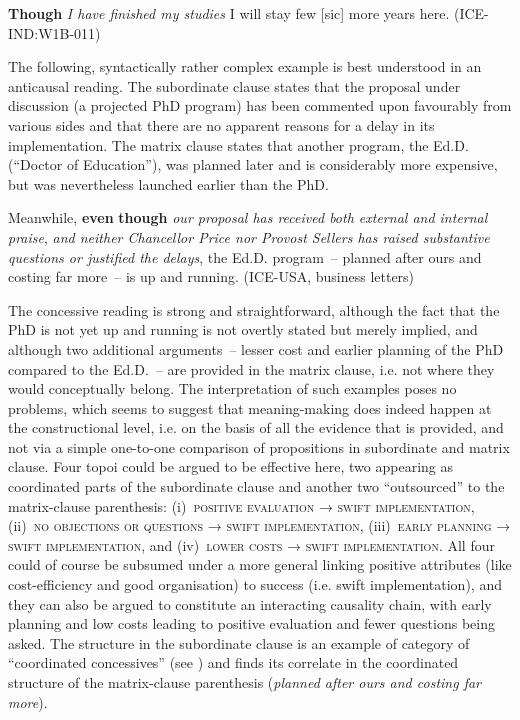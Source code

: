\ea\label{ex:43}   \label{bkm:Ref487277508}\textbf{Though} \textit{I have finished my studies} I will stay few [sic] more years here. (ICE-IND:W1B-011)
\z

The following, syntactically rather complex example is best understood in an anticausal reading. The subordinate clause states that the proposal under discussion (a projected PhD program) has been commented upon favourably from various sides and that there are no apparent reasons for a delay in its implementation. The matrix clause states that another program, the Ed.D. (“Doctor of Education”), was planned later and is considerably more expensive, but was nevertheless launched earlier than the PhD.

\eanoraggedright\label{ex:44} \label{bkm:Ref497554696}  Meanwhile, \textbf{even} \textbf{though} \textit{our proposal has received both external and internal praise}, \textit{and neither Chancellor Price nor Provost Sellers has raised substantive questions or justified the delays}, the Ed.D. program~– planned after ours and costing far more~– is up and running. (ICE-USA, business letters)
\z

The concessive reading is strong and straightforward, although the fact that the PhD is not yet up and running is not overtly stated but merely implied, and although two additional arguments~– lesser cost and earlier planning of the PhD compared to the Ed.D.~– are provided in the matrix clause, i.e. not where they would conceptually belong. The interpretation of such examples poses no problems, which seems to suggest that meaning-making does indeed happen at the constructional level, i.e. on the basis of all the evidence that is provided, and not via a simple one-to-one comparison of propositions in subordinate and matrix clause. Four topoi could be argued to be effective here, two appearing as coordinated parts of the subordinate clause and another two “outsourced” to the matrix-clause parenthesis:
(i)~\textsc{positive} \textsc{evaluation} → \textsc{swift} \textsc{implementation},
(ii)~\textsc{no} \textsc{objections} \textsc{or} \textsc{questions} → \textsc{swift} \textsc{implementation},
(iii)~\textsc{early} \textsc{planning} → \textsc{swift} \textsc{implementation}, and
(iv)~\textsc{lower} \textsc{costs} → \textsc{swift} \textsc{implementation}. All four could of course be subsumed under a more general  linking positive attributes (like cost-efficiency and good organisation) to success (i.e. swift implementation), and they can also be argued to constitute an interacting causality chain, with early planning and low costs leading to positive evaluation and fewer questions being asked. The structure in the subordinate clause is an example of  category of “coordinated concessives” (see ) and finds its correlate in the coordinated structure of the matrix-clause parenthesis (\textit{planned after ours and costing far more}).

